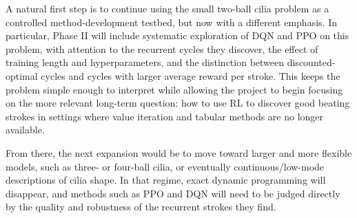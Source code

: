 \documentclass{article}
\begin{document}
A natural first step is to continue using the small two-ball cilia problem as a controlled method-development testbed, but now with a different emphasis. In particular, Phase II will include systematic exploration of DQN and PPO on this problem, with attention to the recurrent cycles they discover, the effect of training length and hyperparameters, and the distinction between discounted-optimal cycles and cycles with larger average reward per stroke. This keeps the problem simple enough to interpret while allowing the project to begin focusing on the more relevant long-term question: how to use RL to discover good beating strokes in settings where value iteration and tabular methods are no longer available.

From there, the next expansion would be to move toward larger and more flexible models, such as three- or four-ball cilia, or eventually continuous/low-mode descriptions of cilia shape. In that regime, exact dynamic programming will disappear, and methods such as PPO and DQN will need to be judged directly by the quality and robustness of the recurrent strokes they find.
\end{document}

